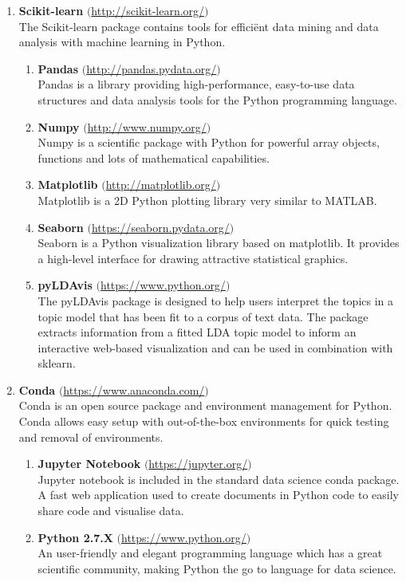 \begin{enumerate}
    \item \textbf{Scikit-learn} $($\url{http://scikit-learn.org/}$)$ \\
    The Scikit-learn package contains tools for effici\"ent data mining and data analysis with machine learning in Python.
    \begin{enumerate}
        \item \textbf{Pandas} $($\url{http://pandas.pydata.org/}$)$ \\
        Pandas is a library providing high-performance, easy-to-use data structures and data analysis tools for the Python programming language.
        \item \textbf{Numpy} $($\url{http://www.numpy.org/}$)$ \\
        Numpy is a scientific package with Python for powerful array objects, functions and lots of mathematical capabilities.
        \item \textbf{Matplotlib} $($\url{http://matplotlib.org/}$)$ \\
        Matplotlib is a 2D Python plotting library very similar to MATLAB.
        \item \textbf{Seaborn} $($\url{https://seaborn.pydata.org/}$)$ \\
        Seaborn is a Python visualization library based on matplotlib. It provides a high-level interface for drawing attractive statistical graphics.
        \item \textbf{pyLDAvis} $($\url{https://www.python.org/}$)$\\
        The pyLDAvis package is designed to help users interpret the topics in a topic model that has been fit to a corpus of text data. The package extracts information from a fitted LDA topic model to inform an interactive web-based visualization and can be used in combination with sklearn.
    \end{enumerate}
    
    \item \textbf{Conda} $($\url{https://www.anaconda.com/}$)$ \\
    Conda is an open source package and environment management for Python. Conda allows easy setup with out-of-the-box environments for quick testing and removal of environments.
    \begin{enumerate}
        \item \textbf{Jupyter Notebook} $($\url{https://jupyter.org/}$)$ \\
        Jupyter notebook is included in the standard data science conda package. A fast web application used to create documents in Python code to easily share code and visualise data.
        \item \textbf{Python 2.7.X} $($\url{https://www.python.org/}$)$\\
        An user-friendly and elegant programming language which has a great scientific community, making Python the go to language for data science.
    \end{enumerate}
    
\end{enumerate}